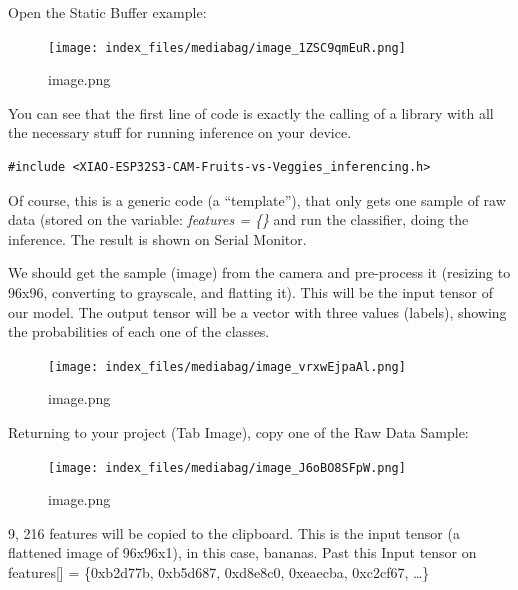 \documentclass[
  letterpaper,
  DIV=11,
  numbers=noendperiod]{scrreprt}
\begin{document}
Open the Static Buffer example:

\begin{figure}[H]

{\centering \texttt{[image: index\_files/mediabag/image\_1ZSC9qmEuR.png]}

}

\caption{image.png}

\end{figure}

You can see that the first line of code is exactly the calling of a
library with all the necessary stuff for running inference on your
device.

\begin{verbatim}
#include <XIAO-ESP32S3-CAM-Fruits-vs-Veggies_inferencing.h>
\end{verbatim}

Of course, this is a generic code (a ``template''), that only gets one
sample of raw data (stored on the variable: \emph{features = \{\}} and
run the classifier, doing the inference. The result is shown on Serial
Monitor.

We should get the sample (image) from the camera and pre-process it
(resizing to 96x96, converting to grayscale, and flatting it). This will
be the input tensor of our model. The output tensor will be a vector
with three values (labels), showing the probabilities of each one of the
classes.

\begin{figure}[H]

{\centering \texttt{[image: index\_files/mediabag/image\_vrxwEjpaAl.png]}

}

\caption{image.png}

\end{figure}

Returning to your project (Tab Image), copy one of the Raw Data Sample:

\begin{figure}[H]

{\centering \texttt{[image: index\_files/mediabag/image\_J6oBO8SFpW.png]}

}

\caption{image.png}

\end{figure}

9, 216 features will be copied to the clipboard. This is the input
tensor (a flattened image of 96x96x1), in this case, bananas. Past this
Input tensor on features{[}{]} = \{0xb2d77b, 0xb5d687, 0xd8e8c0,
0xeaecba, 0xc2cf67, \ldots\}
\end{document}
